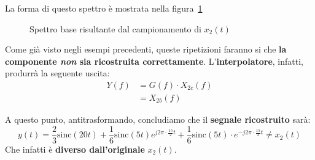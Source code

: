 La forma di questo spettro è mostrata nella figura~\ref{fig:05_12_EsempioPratico2_SpettroBaseSecondaParte}

\begin{figure}[!ht]
    \centering
    \caption{Spettro base risultante dal campionamento di $x_{2}(t)$}
    \label{fig:05_12_EsempioPratico2_SpettroBaseSecondaParte}
\end{figure}

Come già visto negli esempi precedenti, queste ripetizioni faranno si che 
\textbf{la componente \textit{non} sia ricostruita correttamente}.
L'\textbf{interpolatore}, infatti, produrrà la seguente uscita:
\[
    \begin{aligned}
        Y(f) &= G(f)\cdot X_{2c}(f) \\ 
             &= X_{2b}(f)
    \end{aligned}
\]

A questo punto, antitrasformando, concludiamo che il \textbf{segnale ricostruito} sarà:
\[
    y(t) = \frac{2}{3} \text{sinc}(20t) + 
           \frac{1}{6} \text{sinc}(5t) e^{j 2\pi \cdot \frac{15}{2}t} +
           \frac{1}{6} \text{sinc}(5t) \cdot e^{-j 2\pi\cdot \frac{15}{2}t} \ne x_{2}(t)
\]
Che infatti è \textbf{diverso dall'originale} $x_{2}(t)$.
